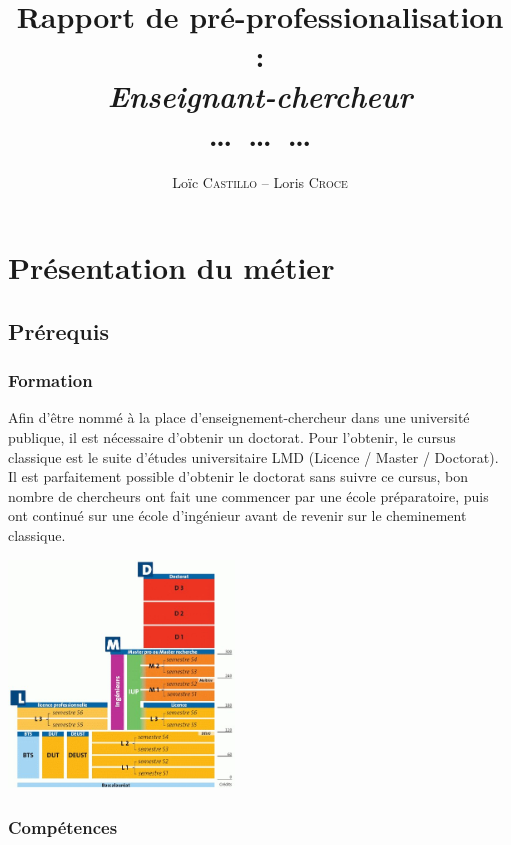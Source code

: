 \documentclass[12pt, a4paper]{report}
\author{Loïc \textsc{Castillo} -- Loris \textsc{Croce}}
\title{\Huge\textbf{Rapport de pré-professionalisation : } \\ \emph{Enseignant-chercheur} \\ \dots\ \dots\ \dots}
\newenvironment{Figure}
  {\par\medskip\noindent\minipage{\linewidth}}
  {\endminipage\par\medskip}
\begin{document}
\maketitle{}

\tableofcontents

\chapter{Présentation du métier}

  \section{Prérequis}

    \subsection{Formation}
    Afin d'être nommé à la place d'enseignement-chercheur dans une université publique, il est nécessaire d'obtenir un doctorat. Pour l'obtenir, le cursus classique est le suite d'études universitaire LMD (Licence / Master / Doctorat). Il est parfaitement possible d'obtenir le doctorat sans suivre ce cursus, bon nombre de chercheurs ont fait une commencer par une école préparatoire, puis ont continué sur une école d'ingénieur avant de revenir sur le cheminement classique.

    \begin{Figure}
      \centering
      \includegraphics[width=6cm]{lmd.jpg}
    \end{Figure}


    \subsection{Compétences}
\end{document}
